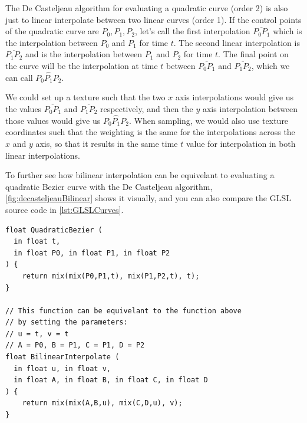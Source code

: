 \documentclass{jcgt}
\begin{document}
The De Casteljeau algorithm for evaluating a quadratic curve (order 2) is also just to linear interpolate between two linear curves (order 1).  If the control points of the quadratic curve are $P_0,P_1,P_2$, let's call the first interpolation $\overline{P_0P_1}$ which is the interpolation between $P_0$ and $P_1$ for time $t$. The second linear interpolation is $\overline{P_1P_2}$ and is the interpolation between $P_1$ and $P_2$ for time $t$.  The final point on the curve will be the interpolation at time $t$ between $\overline{P_0P_1}$ and $\overline{P_1P_2}$, which we can call $\stackrel{\frown}{P_0P_1P_2}$.  

We could set up a texture such that the two $x$ axis interpolations would give us the values $\overline{P_0P_1}$ and $\overline{P_1P_2}$ respectively, and then the $y$ axis interpolation between those values would give us $\stackrel{\frown}{P_0P_1P_2}$.  When sampling, we would also use texture coordinates such that the weighting is the same for the interpolations across the $x$ and $y$ axis, so that it results in the same time $t$ value for interpolation in both linear interpolations.

To further see how bilinear interpolation can be equivelant to evaluating a quadratic Bezier curve with the De Casteljeau algorithm, \autoref{fig:decasteljeauBilinear} shows it visually, and you can also compare the GLSL source code in \autoref{lst:GLSLCurves}.

\begin{lstlisting}[caption={GLSL implementation of bilinear interpolation and the De Casteljeau algorithm for a quadratic Bezier curve.}, label={lst:GLSLCurves}]
float QuadraticBezier (
  in float t,
  in float P0, in float P1, in float P2
) {
    return mix(mix(P0,P1,t), mix(P1,P2,t), t);
}

// This function can be equivelant to the function above
// by setting the parameters:
// u = t, v = t
// A = P0, B = P1, C = P1, D = P2
float BilinearInterpolate (
  in float u, in float v,
  in float A, in float B, in float C, in float D
) {
    return mix(mix(A,B,u), mix(C,D,u), v);
}

\end{lstlisting}
\end{document}

